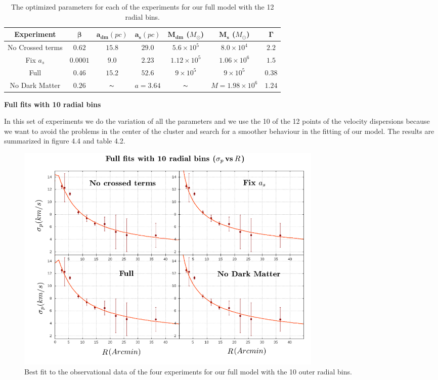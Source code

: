 \begin{table}[H]
\begin{center}
\begin{tabular}{| c | c | c | c | c | c | c| }
    \hline
    \textbf{Experiment} & $\mathbf{\beta}$ & $\mathbf{a_{dm}} (pc)$ & $\mathbf{a_{s}} (pc)$ & $\mathbf{M_{dm}}$ ($M_{\odot}$) & $\mathbf{M_{s}}$ ($M_{\odot}$) & $\mathbf{\Gamma}$\\ \hline
	No Crossed terms & $0.62$ &	$15.8$ &	$29.0$ &	$5.6 \times 10^{5}$ &	$8.0 \times 10^{4}$ &	$2.2$\\ \hline
	Fix $a_s$ &	$0.0001$ &	$9.0$ &	$2.23$ &	$1.12 \times 10^{5}$ &	$1.06 \times 10 ^{6}$ &	$1.5$\\ \hline
	Full &	$0.46$ &	$15.2$ &	$52.6$ &	$9 \times 10^{5}$ &	$9 \times 10^{5}$ &	$0.38$\\ \hline
	No Dark Matter &	$0.26$ & $\thicksim$	& $ a = 3.64$  & $\thicksim$ & $  M = 1.98 \times 10^{6}$ & 	$1.24$\\
    \hline
  \end{tabular} 
\caption[Optimized parameters for our full model with the 12 radial bins.]{The optimized parameters for each of the experiments for our full model with the 12 radial bins.}
\end{center}
\end{table}

\newpage

\begin{center}
\textbf{Full fits with 10 radial bins}
\end{center}

In this set of experiments we do the variation of all the parameters and we use the 10 of the 12 points of the velocity dispersions because we want to avoid the problems in the center of the cluster and search for a smoother behaviour in the fitting of our model. The results are summarized in figure 4.4 and table 4.2.

\begin{figure}[H]
\centering
\includegraphics[width=15cm]{images/all_params_refinado_10.png}
\caption[Best fit of the full model for 10 radial bins]{Best fit to the observational data of the four experiments for our full model with the 10 outer radial bins.}
\end{figure}

